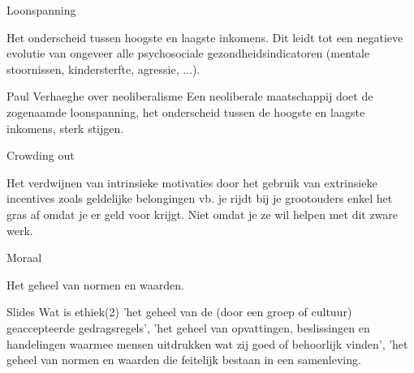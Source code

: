 \documentclass[main.tex]{subfiles}
\begin{document}
\begin{examenvraag}
    \begin{vraag}
        Loonspanning
    \end{vraag}

    \begin{antwoord}
        Het onderscheid tussen hoogste en laagste inkomens.
	Dit leidt tot een negatieve evolutie van ongeveer alle psychosociale gezondheidsindicatoren (mentale stoornissen, kindersterfte, agressie, ...).
        \begin{citaat}{Paul Verhaeghe over neoliberalisme}
            Een neoliberale maatschappij doet de zogenaamde loonspanning, het onderscheid tussen de hoogste en laagste inkomens, sterk stijgen.
        \end{citaat}
    \end{antwoord}
\end{examenvraag}


\begin{examenvraag}
    \begin{vraag}
        Crowding out
    \end{vraag}

    \begin{antwoord}
	Het verdwijnen van intrinsieke motivaties door het gebruik van extrinsieke incentives zoals 
	geldelijke belongingen vb.‭ ‬je rijdt bij je grootouders enkel het gras af omdat je er geld voor 
	krijgt.‭ ‬Niet omdat je ze wil helpen met dit zware werk.
    \end{antwoord}
\end{examenvraag}


\begin{examenvraag}
    \begin{vraag}
        Moraal
    \end{vraag}

    \begin{antwoord}
        Het geheel van normen en waarden. 
        \begin{citaat}{Slides Wat is ethiek(2)}
            'het geheel van de (door een groep of cultuur) geaccepteerde gedragsregels', 
            'het geheel van opvattingen, beslissingen en handelingen waarmee mensen uitdrukken wat zij goed of behoorlijk vinden',
            'het geheel van normen en waarden die feitelijk bestaan in een samenleving.
        \end{citaat}
    \end{antwoord}
\end{examenvraag}
\end{document}
